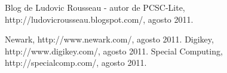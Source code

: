 \begin{thebibliography}{200}
\bibitem{} Blog de Ludovic Rousseau - autor de PCSC-Lite, http://ludovicrousseau.blogspot.com/, agosto 2011.

 Newark, http://www.newark.com/, agosto 2011.
 Digikey, http://www.digikey.com/, agosto 2011.
 Special Computing, http://specialcomp.com/, agosto 2011.
\end{thebibliography}
